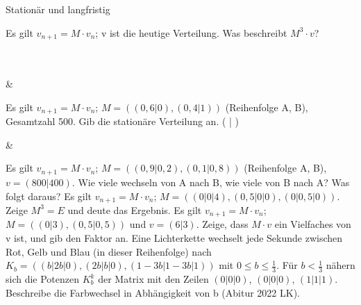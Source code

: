 \setcounter{aufgabe}{16}

\begin{aufgabe}{Stationär und langfristig}
\begin{teile}
\teil Es gilt $v_{n+1} = M \cdot v_n$; v ist die heutige Verteilung. Was beschreibt $M^3 \cdot v$? \\  \\  \\ 
\end{teile}
\begin{gleichungsraster}[2]
 &
\end{gleichungsraster}
\begin{teile}
\teil Es gilt $v_{n+1} = M \cdot v_n$; $M = ((0{,}6 | 0), (0{,}4 | 1))$ (Reihenfolge A, B), Gesamtzahl 500. Gib die stationäre Verteilung an. ( \leerfeld | \leerfeld )
\end{teile}
\begin{gleichungsraster}[2]
 &
\end{gleichungsraster}
\begin{teile}
\teil Es gilt $v_{n+1} = M \cdot v_n$; $M = ((0{,}9 | 0{,}2), (0{,}1 | 0{,}8))$ (Reihenfolge A, B), $v = (800 | 400)$. Wie viele wechseln von A nach B, wie viele von B nach A? Was folgt daraus?
\teil Es gilt $v_{n+1} = M \cdot v_n$; $M = ((0 | 0 | 4), (0{,}5 | 0 | 0), (0 | 0{,}5 | 0))$. Zeige $M^3 = E$ und deute das Ergebnis.
\teil Es gilt $v_{n+1} = M \cdot v_n$; $M = ((0 | 3), (0{,}5 | 0{,}5))$ und $v = (6 | 3)$. Zeige, dass $M \cdot v$ ein Vielfaches von v ist, und gib den Faktor an.
\teil Eine Lichterkette wechselt jede Sekunde zwischen Rot, Gelb und Blau (in dieser Reihenfolge) nach $K_b = ((b | 2b | 0), (2b | b | 0), (1 - 3b | 1 - 3b | 1))$ mit $0 \le b \le \frac{1}{3}$. Für $b < \frac{1}{3}$ nähern sich die Potenzen $K_b^k$ der Matrix mit den Zeilen $(0 | 0 | 0)$, $(0 | 0 | 0)$, $(1 | 1 | 1)$. Beschreibe die Farbwechsel in Abhängigkeit von b \hfill (Abitur 2022 LK).
\end{teile}
\end{aufgabe}

